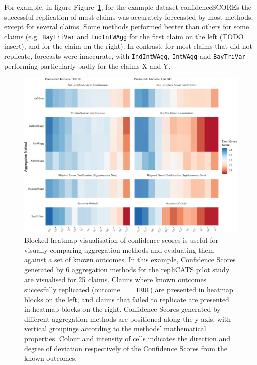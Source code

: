 \documentclass[article]{jss}
\begin{document}
For example, in figure Figure~\ref{fig-heatmap}, for the example dataset
{confidenceSCOREs} the successful replication of most claims was
accurately forecasted by most methods, except for several claims. Some
methods performed better than others for some claims
(e.g.~\texttt{BayTriVar} and \texttt{IndIntWAgg} for the first claim on
the left (TODO insert), and for the claim on the right). In contrast,
for most claims that did not replicate, forecasts were inaccurate, with
\texttt{IndIntWAgg}, \texttt{IntWAgg} and \texttt{BayTriVar} performing
particularly badly for the claims X and Y.

\begin{figure}

{\centering \includegraphics{aggreCAT_files/figure-pdf/fig-heatmap-1.pdf}

}

\caption{\label{fig-heatmap}Blocked heatmap visualisation of confidence
scores is useful for visually comparing aggregation methods and
evaluating them against a set of known outcomes. In this example,
Confidence Scores generated by 6 aggregation methods for the repliCATS
pilot study are visualised for 25 claims. Claims where known outcomes
succesfully replicated (outcome == \texttt{TRUE}) are presented in
heatmap blocks on the left, and claims that failed to replicate are
presented in heatmap blocks on the right. Confidence Scores generated by
different aggregation methods are positioned along the y-axis, with
vertical groupings according to the methods' mathematical properties.
Colour and intensity of cells indicates the direction and degree of
deviation respectively of the Confidence Scores from the known
outcomes.}

\end{figure}
\end{document}
